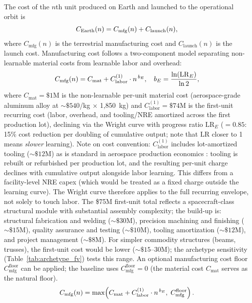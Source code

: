 \documentclass[5p,twocolumn]{elsarticle}
\begin{document}
The cost of the $n$th unit produced on Earth and launched to the operational orbit is
\begin{equation}\small
  C_{\mathrm{Earth}}(n) = C_{\mathrm{mfg}}(n) + C_{\mathrm{launch}}(n),
  \label{eq:earth_unit}
\end{equation}
where $C_{\mathrm{mfg}}(n)$ is the terrestrial manufacturing cost and $C_{\mathrm{launch}}(n)$ is the launch cost. Manufacturing cost follows a two-component model separating non-learnable material costs from learnable labor and overhead:
\begin{equation}\small
  C_{\mathrm{mfg}}(n) = C_{\mathrm{mat}} + C_{\mathrm{labor}}^{(1)} \cdot n^{\,b_E}, \quad b_E = \frac{\ln(\mathrm{LR}_E)}{\ln 2},
  \label{eq:earth_mfg}
\end{equation}
where $C_{\mathrm{mat}} = \$1$M is the non-learnable per-unit material cost (aerospace-grade aluminum alloy at ${\sim}\$540$/kg $\times$ 1{,}850~kg) and $C_{\mathrm{labor}}^{(1)} = \$74$M is the first-unit recurring cost (labor, overhead, and tooling/NRE amortized across the first production lot), declining via the Wright curve with progress ratio $\mathrm{LR}_E$ ($= 0.85$: 15\% cost reduction per doubling of cumulative output; note that $\mathrm{LR}$ closer to 1 means \emph{slower} learning). Note on cost convention: $C_{\mathrm{labor}}^{(1)}$ includes lot-amortized tooling (${\sim}\$12$M) as is standard in aerospace production economics \cite{wertz2011}: tooling is rebuilt or refurbished per production lot, and the resulting per-unit charge declines with cumulative output alongside labor learning. This differs from a facility-level NRE capex (which would be treated as a fixed charge outside the learning curve). The Wright curve therefore applies to the full recurring envelope, not solely to touch labor. The \$75M first-unit total reflects a spacecraft-class structural module with substantial assembly complexity; the build-up is: structural fabrication and welding (${\sim}\$30$M), precision machining and finishing (${\sim}\$15$M), quality assurance and testing (${\sim}\$10$M), tooling amortization (${\sim}\$12$M), and project management (${\sim}\$8$M). For simpler commodity structures (beams, trusses), the first-unit cost would be lower (${\sim}\$15$--$30$M); the archetype sensitivity (Table~\ref{tab:archetype_fv}) tests this range. An optional manufacturing cost floor $C_{\mathrm{mfg}}^{\mathrm{floor}}$ can be applied; the baseline uses $C_{\mathrm{mfg}}^{\mathrm{floor}} = 0$ (the material cost $C_{\mathrm{mat}}$ serves as the natural floor).
\begin{equation}\small
  C_{\mathrm{mfg}}(n) = \max\!\left(C_{\mathrm{mat}} + C_{\mathrm{labor}}^{(1)} \cdot n^{\,b_E},\; C_{\mathrm{mfg}}^{\mathrm{floor}}\right).
  \label{eq:earth_mfg_floor}
\end{equation}
\end{document}
